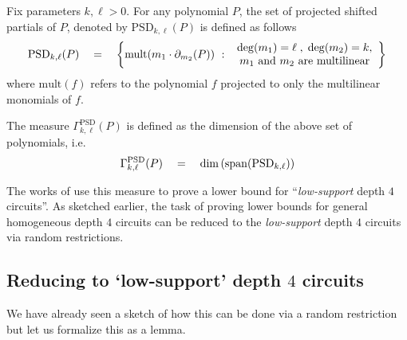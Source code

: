 \documentclass{beatcs}
\newcommand{\spaced}[1]{\quad#1\quad}
\begin{document}
\begin{definition}
Fix parameters $k,\ell > 0$. For any polynomial $P$, the set of projected shifted partials of $P$, denoted by $\mathrm{PSD}_{k,\ell}(P)$ is defined as follows
\[
\mathrm{PSD}_{k,\ell}(P) \spaced{=} \setdef{\mathrm{mult}(m_1 \cdot \partial_{m_2}(P))}{\begin{array}{c}\deg(m_1) = \ell\;,\; \deg(m_2) = k,\\ \text{$m_1$ and $m_2$ are multilinear}\end{array}}
\]
where $\mathrm{mult}(f)$ refers to the polynomial $f$ projected to only the multilinear monomials of $f$. 

The measure $\Gamma^{\mathrm{PSD}}_{k,\ell}(P)$ is defined as the dimension of the above set of polynomials, i.e.
\[\Gamma^{\mathrm{PSD}}_{k,\ell}(P) \spaced{=} \dim\inparen{\mathrm{span}(\mathrm{PSD}_{k,\ell})}\]
\end{definition}

The works of \cite{KLSS,KS14} use this measure to prove a lower bound for ``\emph{low-support} depth $4$ circuits''. As sketched earlier, the task of proving lower bounds for general homogeneous depth $4$ circuits can be reduced to the \emph{low-support} depth $4$ circuits via random restrictions. 

\subsection{Reducing to `low-support' depth $4$ circuits}\label{sec:red-to-low-support}

We have already seen a sketch of how this can be done via a random restriction but let us formalize this as a lemma. 
\end{document}
